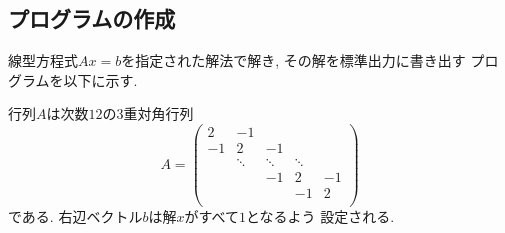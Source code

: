 \documentclass[a4paper]{jarticle}
\begin{document}
{{\subsection{プログラムの作成}
\label{sec:testprog3}
線型方程式$Ax=b$を指定された解法で解き, その解を標準出力に書き出す
プログラムを以下に示す. 

行列$A$は次数$12$の3重対角行列
\[
A = 
\left(
\begin{array}{ccccc}
2 & -1 &   &  &   \\
-1 & 2 & -1 &  &   \\
  & \ddots  & \ddots  & \ddots  &   \\
  &   & -1 & 2 & -1 \\
  &   &   & -1 & 2 \\
\end{array}
\right)
\]
である. 右辺ベクトル$b$は解$x$がすべて$1$となるよう
設定される. 

}}
\end{document}
